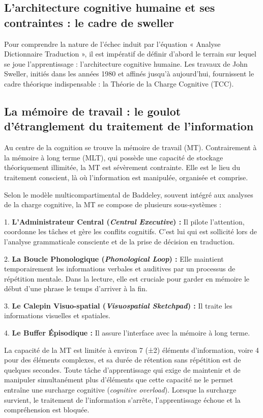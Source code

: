 \subsection{L'architecture cognitive humaine et ses contraintes : le cadre de sweller}

Pour comprendre la nature de l'échec induit par l'équation « Analyse \+ Dictionnaire \+ Traduction
», il est impératif de définir d'abord le terrain sur lequel se joue l'apprentissage :
l'architecture cognitive humaine. Les travaux de John Sweller, initiés dans les années 1980 et
affinés jusqu'à aujourd'hui, fournissent le cadre théorique indispensable : la Théorie de la Charge
Cognitive (TCC).



\subsection{La mémoire de travail : le goulot d'étranglement du traitement de l'information}

Au centre de la cognition se trouve la mémoire de travail (MT). Contrairement à la mémoire à long
terme (MLT), qui possède une capacité de stockage théoriquement illimitée, la MT est sévèrement
contrainte. Elle est le lieu du traitement conscient, là où l'information est manipulée, organisée
et comprise.\cite{II-1-3-ref1}

Selon le modèle multicompartimental de Baddeley, souvent intégré aux analyses de la charge
cognitive, la MT se compose de plusieurs sous-systèmes :

1. \textbf{L'Administrateur Central (\textit{Central Executive}) :} Il pilote l'attention, coordonne
les tâches et gère les conflits cognitifs. C'est lui qui est sollicité lors de l'analyse
grammaticale consciente et de la prise de décision en traduction.\cite{II-1-3-ref2}

2. \textbf{La Boucle Phonologique (\textit{Phonological Loop}) :} Elle maintient temporairement les
informations verbales et auditives par un processus de répétition mentale. Dans la lecture, elle est
cruciale pour garder en mémoire le début d'une phrase le temps d'arriver à la fin.\cite{II-1-3-ref2}

3. \textbf{Le Calepin Visuo-spatial (\textit{Visuospatial Sketchpad}) :} Il traite les informations
visuelles et spatiales.

4. \textbf{Le Buffer Épisodique :} Il assure l'interface avec la mémoire à long terme.

La capacité de la MT est limitée à environ 7 (±2) éléments d'information, voire 4 pour des éléments
complexes, et sa durée de rétention sans répétition est de quelques secondes.\cite{II-1-3-ref1}
Toute tâche d'apprentissage qui exige de maintenir et de manipuler simultanément plus d'éléments que
cette capacité ne le permet entraîne une surcharge cognitive (\textit{cognitive overload}). Lorsque
la surcharge survient, le traitement de l'information s'arrête, l'apprentissage échoue et la
compréhension est bloquée.\cite{II-1-3-ref3}



